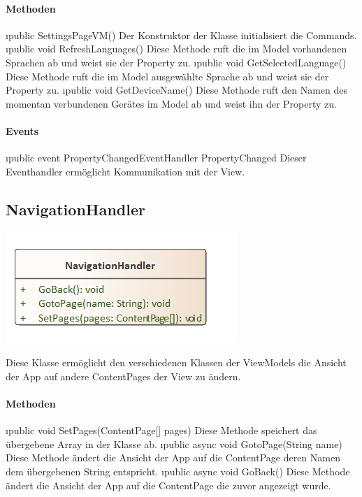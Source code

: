 \documentclass[../entwurf.tex]{subfiles}
\begin{document}
\paragraph{Methoden}
\begin{itemize}
	\i{public SettingsPageVM()} Der Konstruktor der Klasse initialisiert die Commands.
	\i{public void RefreshLanguages()} Diese Methode ruft die im Model vorhandenen Sprachen ab und weist sie der Property  zu.
	\i{public void GetSelectedLanguage()} Diese Methode ruft die im Model ausgewählte Sprache ab und weist sie der Property  zu.
	\i{public void GetDeviceName()} Diese Methode ruft den Namen des momentan verbundenen Gerätes im Model ab und weist ihn der Property  zu.
\end{itemize}
\paragraph{Events}
\begin{itemize}
	\i{public event PropertyChangedEventHandler PropertyChanged} Dieser Eventhandler ermöglicht Kommunikation mit der View.
\end{itemize}
\subsection{NavigationHandler}
\begin{minipage}{0.45\textwidth}
\includegraphics[scale=0.75]{../graphics/vm_klassen/NavigationHandler.png}
\end{minipage}
\begin{minipage}{0.55\textwidth}
 \newline
Diese Klasse ermöglicht den verschiedenen Klassen der ViewModels die Ansicht der App auf andere ContentPages der View zu ändern.
\end{minipage}
\paragraph{Methoden}
\begin{itemize}
	\i{public void SetPages(ContentPage[] pages)} Diese Methode speichert das übergebene Array in der Klasse ab.
	\i{public async void GotoPage(String name)} Diese Methode ändert die Ansicht der App auf die ContentPage deren Namen dem übergebenen String entspricht.
	\i{public async void GoBack()} Diese Methode ändert die Ansicht der App auf die ContentPage die zuvor angezeigt wurde.
\end{itemize}
\end{document}
